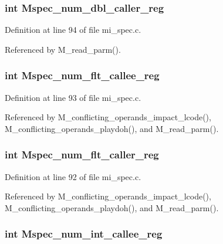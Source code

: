 \subsubsection{\setlength{\rightskip}{0pt plus 5cm}int \bf{Mspec\_\-num\_\-dbl\_\-caller\_\-reg}}\label{m__spec_8h_3516a6a77dc8d36a7a4b1835aa4b41f5}




Definition at line 94 of file mi\_\-spec.c.

Referenced by M\_\-read\_\-parm().
\subsubsection{\setlength{\rightskip}{0pt plus 5cm}int \bf{Mspec\_\-num\_\-flt\_\-callee\_\-reg}}\label{m__spec_8h_a7ca008797ba16f20527b28b1c724684}




Definition at line 93 of file mi\_\-spec.c.

Referenced by M\_\-conflicting\_\-operands\_\-impact\_\-lcode(), M\_\-conflicting\_\-operands\_\-playdoh(), and M\_\-read\_\-parm().
\subsubsection{\setlength{\rightskip}{0pt plus 5cm}int \bf{Mspec\_\-num\_\-flt\_\-caller\_\-reg}}\label{m__spec_8h_b8bd464c66465962e422af686ae35121}




Definition at line 92 of file mi\_\-spec.c.

Referenced by M\_\-conflicting\_\-operands\_\-impact\_\-lcode(), M\_\-conflicting\_\-operands\_\-playdoh(), and M\_\-read\_\-parm().
\subsubsection{\setlength{\rightskip}{0pt plus 5cm}int \bf{Mspec\_\-num\_\-int\_\-callee\_\-reg}}\label{m__spec_8h_05563f3fc90540403401a7590ae885b0}




